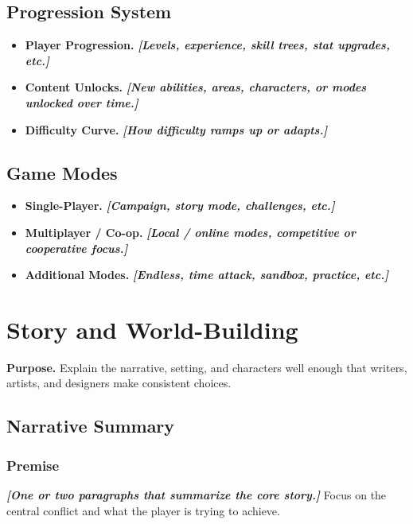 \documentclass[12pt]{article}
\newcommand{\placeholder}[1]{\textbf{\textit{[#1]}}}
\begin{document}
\subsection{Progression System}

\begin{itemize}
    \item \textbf{Player Progression.} \placeholder{Levels, experience, skill trees, stat upgrades, etc.}
    \item \textbf{Content Unlocks.} \placeholder{New abilities, areas, characters, or modes unlocked over time.}
    \item \textbf{Difficulty Curve.} \placeholder{How difficulty ramps up or adapts.}
\end{itemize}

\subsection{Game Modes}

\begin{itemize}
    \item \textbf{Single-Player.} \placeholder{Campaign, story mode, challenges, etc.}
    \item \textbf{Multiplayer / Co-op.} \placeholder{Local / online modes, competitive or cooperative focus.}
    \item \textbf{Additional Modes.} \placeholder{Endless, time attack, sandbox, practice, etc.}
\end{itemize}

\section{Story and World-Building}

\textbf{Purpose.} Explain the narrative, setting, and characters well enough that writers, artists,
and designers make consistent choices.

\subsection{Narrative Summary}

\subsubsection*{Premise}

\placeholder{One or two paragraphs that summarize the core story.} Focus on the central conflict
and what the player is trying to achieve.
\end{document}
